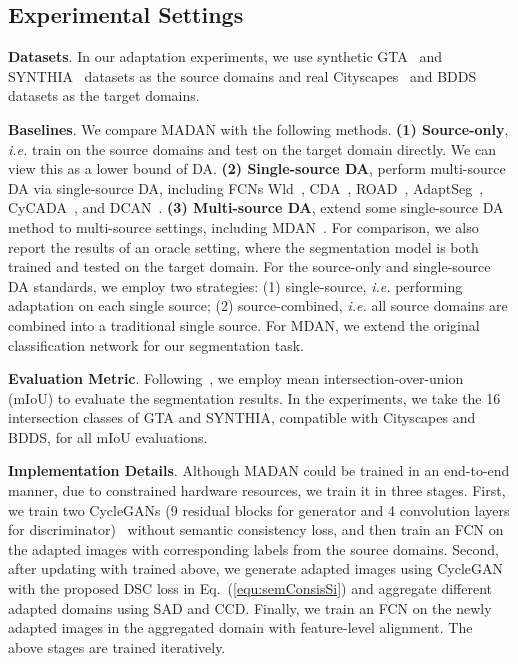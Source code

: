 \documentclass{article}
\begin{document}
\subsection{Experimental Settings}
\textbf{Datasets}. In our adaptation experiments, we use synthetic GTA~\cite{richter2016playing} and SYNTHIA~\cite{ros2016synthia} datasets as the source domains and real Cityscapes~\cite{cordts2016cityscapes} and BDDS~\cite{yu2018bdd100k} datasets as the target domains.









\textbf{Baselines}. We compare  MADAN with the following methods. \textbf{(1) Source-only}, \textit{i.e.} train on the source domains and test on the target domain directly. We can view this as a lower bound of DA. \textbf{(2) Single-source DA}, perform multi-source DA via single-source DA, including FCNs Wld~\cite{hoffman2016fcns}, CDA~\cite{zhang2017curriculum}, ROAD~\cite{chen2018road}, AdaptSeg~\cite{tsai2018learning}, CyCADA~\cite{hoffman2018cycada}, and DCAN~\cite{wu2018dcan}. \textbf{(3) Multi-source DA}, extend some single-source DA method to multi-source settings, including MDAN~\cite{zhao2018adversarial}. For comparison, we also report the results of an oracle setting, where the segmentation model is both trained and tested on the target domain.
For the source-only and single-source DA standards, we employ two strategies: (1) single-source, \textit{i.e.} performing adaptation on each single source; (2) source-combined, \textit{i.e.} all source domains are combined into a traditional single source. For MDAN, we extend the original classification network for our segmentation task.



\textbf{Evaluation Metric}.
Following~\cite{hoffman2016fcns,zhang2017curriculum,hoffman2018cycada,yue2019domain}, we employ mean intersection-over-union (mIoU) to evaluate the segmentation results. In the experiments, we take the 16 intersection classes of GTA and SYNTHIA, compatible with Cityscapes and BDDS, for all mIoU evaluations.



\textbf{Implementation Details}.
Although MADAN could be trained in an end-to-end manner, due to constrained  hardware resources, we train it in three stages. First, we train two CycleGANs (9 residual blocks for generator and 4 convolution layers for discriminator)~\cite{zhu2017unpaired} without semantic consistency loss, and then train an FCN  on the adapted images with corresponding labels from the source domains. Second, after updating  with  trained above, we generate adapted images using CycleGAN with the proposed DSC loss in Eq.~(\ref{equ:semConsisSi}) and aggregate different adapted domains using SAD and CCD. Finally, we train an FCN on the newly adapted images in the aggregated domain with feature-level alignment. The above stages are trained iteratively.
\end{document}
